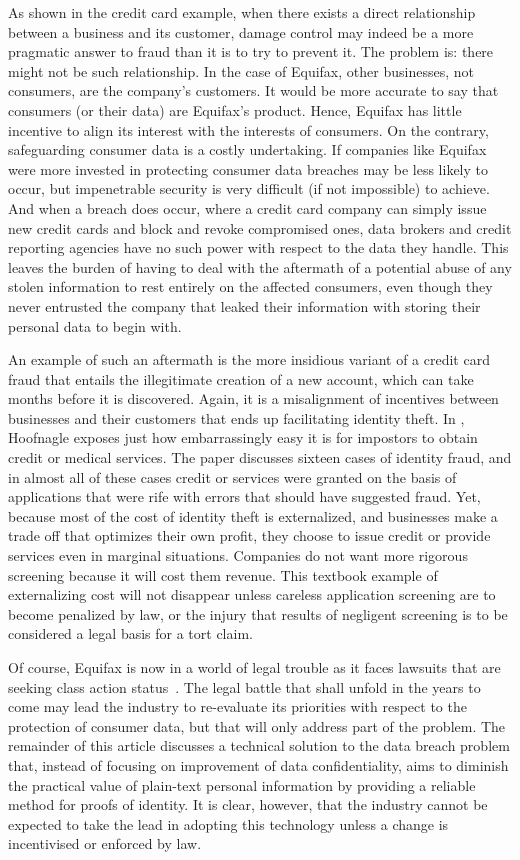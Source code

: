 \documentclass[conference]{IEEEtran}
\begin{document}
As shown in the credit card example, when there exists a direct relationship between a business and its customer, damage control may indeed be a more pragmatic answer to fraud than it is to try to prevent it. The problem is: there might not be such relationship. In the case of Equifax, other businesses, not consumers, are the company's customers. It would be more accurate to say that consumers (or their data) are Equifax's product. Hence, Equifax has little incentive to align its interest with the interests of consumers. On the contrary, safeguarding consumer data is a costly undertaking. If companies like Equifax were more invested in protecting consumer data breaches may be less likely to occur, but impenetrable security is very difficult (if not impossible) to achieve. And when a breach does occur, where a credit card company can simply issue new credit cards and block and revoke compromised ones, data brokers and credit reporting agencies have no such power with respect to the data they handle. This leaves the burden of having to deal with the aftermath of a potential abuse of any stolen information to rest entirely on the affected consumers, even though they never entrusted the company that leaked their information with storing their personal data to begin with.

An example of such an aftermath is the more insidious variant of a credit card fraud that entails the illegitimate creation of a new account, which can take months before it is discovered. Again, it is a misalignment of incentives between businesses and their customers that ends up facilitating identity theft. In \cite{hoofnagle2009internalizing}, Hoofnagle exposes just how embarrassingly easy it is for impostors to obtain credit or medical services. The paper discusses sixteen cases of identity fraud, and in almost all of these cases credit or services were granted on the basis of applications that were rife with errors that should have suggested fraud. Yet, because most of the cost of identity theft is externalized, and businesses make a trade off that optimizes their own profit, they choose to issue credit or provide services even in marginal situations. Companies do not want more rigorous screening because it will cost them revenue. This textbook example of externalizing cost will not disappear unless careless application screening are to become penalized by law, or the injury that results of negligent screening is to be considered a legal basis for a tort claim.

Of course, Equifax is now in a world of legal trouble as it faces lawsuits that are seeking class action status~\cite{ChicagoTribune}. The legal battle that shall unfold in the years to come may lead the industry to re-evaluate its priorities with respect to the protection of consumer data, but that will only address part of the problem. The remainder of this article discusses a technical solution to the data breach problem that, instead of focusing on improvement of data confidentiality, aims to diminish the practical value of plain-text personal information by providing a reliable method for proofs of identity. It is clear, however, that the industry cannot be expected to take the lead in adopting this technology unless a change is incentivised or enforced by law.
\end{document}
